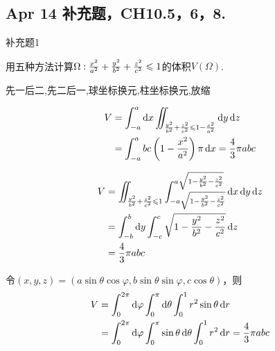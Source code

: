 \setcounter{chapter}{7} %

\chapter{}


\section{Apr 14 补充题，CH10.5，6，8.}



\begin{exercise}
    {补充题1}

    用五种方法计算$\Omega:\frac{x^2}{a^2}+\frac{y^2}{b^2}+\frac{z^2}{c^2}\leqslant 1$的体积$V(\Omega)$.
\end{exercise}

\begin{solution}
    先一后二,先二后一,球坐标换元,柱坐标换元,放缩

    \begin{align*}
        V &= \int_{-a}^a \operatorname{d\!} x \iint_{\frac{y^2}{b^2}+\frac{z^2}{c^2} \leqslant 1 - \frac{x^2}{a^2}} \operatorname{d\!} y \operatorname{d\!} z \\
        &= \int_{-a}^a bc \left( 1 - \frac{x^2}{a^2} \right) \pi \operatorname{d\!} x = \frac{4}{3} \pi abc
    \end{align*}

    \begin{align*}
        V &= \iint_{\frac{y^2}{b^2}+\frac{z^2}{c^2} \leqslant 1} \int_{-a\sqrt{1 - \frac{y^2}{b^2} - \frac{z^2}{c^2}}}^{a\sqrt{1 - \frac{y^2}{b^2} - \frac{z^2}{c^2}}} \operatorname{d\!} x \operatorname{d\!} y \operatorname{d\!} z \\
        &= \int_{-b}^b \operatorname{d\!} y \int_{-c}^c \sqrt{1 - \frac{y^2}{b^2} - \frac{z^2}{c^2}} \operatorname{d\!} z \\
        &= \frac{4}{3} \pi abc
    \end{align*}

    令$(x,y,z) = (a \sin \theta \cos \varphi, b \sin \theta \sin \varphi, c \cos \theta)$，则
    \begin{align*}
        V &= \int_0^{2\pi} \operatorname{d\!} \varphi \int_0^{\pi} \operatorname{d\!} \theta \int_0^1 r^2 \sin \theta \operatorname{d\!} r \\
        &= \int_0^{2\pi} \operatorname{d\!} \varphi \int_0^{\pi} \sin \theta \operatorname{d\!} \theta \int_0^1 r^2 \operatorname{d\!} r = \frac{4}{3} \pi abc
    \end{align*}
\end{solution}






